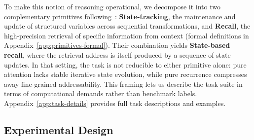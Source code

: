 \documentclass[11pt]{article}
\theoremstyle{definition}
\begin{document}

To make this notion of reasoning operational, we decompose it into two complementary primitives following~\cite{merrill2026olmo}: \textbf{State-tracking}, the maintenance and update of structured variables across sequential transformations, and \textbf{Recall}, the high-precision retrieval of specific information from context (formal definitions in Appendix~\ref{app:primitives-formal}). Their combination yields \textbf{State-based recall}, where the retrieval address is itself produced by a sequence of state updates. In that setting, the task is not reducible to either primitive alone: pure attention lacks stable iterative state evolution, while pure recurrence compresses away fine-grained addressability. This framing lets us describe the task suite in terms of computational demands rather than benchmark labels. Appendix~\ref{app:task-details} provides full task descriptions and examples.

\subsection{Experimental Design}
\end{document}
